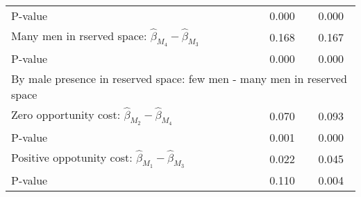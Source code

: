 \begin{tabular}{l*{2}{c}}
\quad P-value       &       0.000         &       0.000         \\
\quad Many men in rserved space: $\hat\beta_{M_4} - \hat\beta_{M_3}$ &       0.168         &       0.167         \\
\quad P-value       &       0.000         &       0.000         \\
\multicolumn{3}{l}{By male presence in reserved space: few men - many men in reserved space} \\ \quad Zero opportunity cost: $\hat\beta_{M_2} - \hat\beta_{M_4}$&       0.070         &       0.093         \\
\quad P-value       &       0.001         &       0.000         \\
\quad Positive oppotunity cost: $\hat\beta_{M_1} - \hat\beta_{M_3}$ &       0.022         &       0.045         \\
\quad P-value       &       0.110         &       0.004         \\
\hline\hline \end{tabular}
